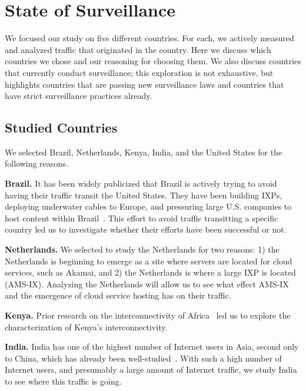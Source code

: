 \section{State of Surveillance}
\label{surv}
We focused our study on five different countries. For each, we actively measured and analyzed traffic that originated in the country.  Here we discuss which countries we chose and our reasoning for choosing them.  We also discuss countries that currently conduct surveillance; this exploration is not exhaustive, but highlights countries that are passing new surveillance laws and countries that have strict surveillance practices already.   

\subsection{Studied Countries}
We selected Brazil, Netherlands, Kenya, India, and the United States for the following reasons.

{\bf Brazil.} It has been widely publicized that Brazil is actively trying to avoid having their traffic transit the United States.  They have been building IXPs, deploying underwater cables to Europe, and pressuring large U.S. companies to host content within Brazil~\cite{brazil_history, brazil_break_from_US, brazil_conference,
  brazil_conference2, brazil_human_rights, brazil_cable, brazil_us_companies, brazil_IXP1}.  This effort to avoid traffic transitting a specific country led us to investigate whether their efforts have been successful or not.

{\bf Netherlands.}  We selected to study the Netherlands for two reasons: 1) the Netherlands is beginning to emerge as a site where servers are located for cloud services, such as Akamai, and 2) the Netherlands is where a large IXP is located (AMS-IX). Analyzing the Netherlands will allow us to see what effect AMS-IX and the emergence of cloud service hosting has on their traffic.

{\bf Kenya.} Prior research on the interconnectivity of Africa~\cite{gupta2014peering, fanou2015diversity} led us to explore the characterization of Kenya's interconnectivity.

{\bf India.}  India has one of the highest number of Internet users in Asia, second only to China, which has already been well-studied~\cite{tsui2003panopticon, wang2010discourse}.  With such a high number of Internet users, and presumably a large amount of Internet traffic, we study India to see where this traffic is going.

